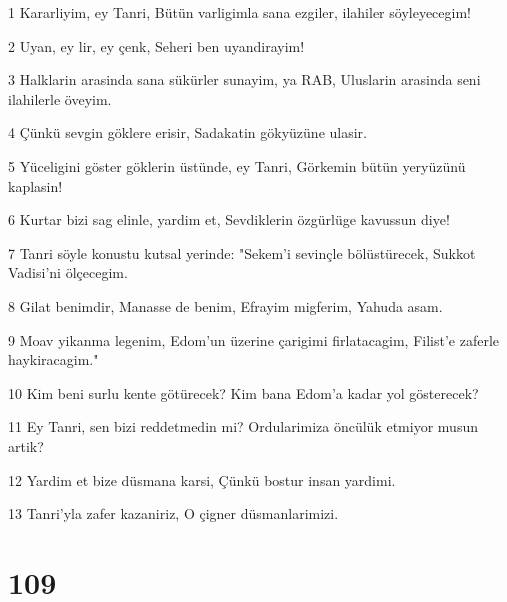\par 1 Kararliyim, ey Tanri, Bütün varligimla sana ezgiler, ilahiler söyleyecegim!
\par 2 Uyan, ey lir, ey çenk, Seheri ben uyandirayim!
\par 3 Halklarin arasinda sana sükürler sunayim, ya RAB, Uluslarin arasinda seni ilahilerle öveyim.
\par 4 Çünkü sevgin göklere erisir, Sadakatin gökyüzüne ulasir.
\par 5 Yüceligini göster göklerin üstünde, ey Tanri, Görkemin bütün yeryüzünü kaplasin!
\par 6 Kurtar bizi sag elinle, yardim et, Sevdiklerin özgürlüge kavussun diye!
\par 7 Tanri söyle konustu kutsal yerinde: "Sekem'i sevinçle bölüstürecek, Sukkot Vadisi'ni ölçecegim.
\par 8 Gilat benimdir, Manasse de benim, Efrayim migferim, Yahuda asam.
\par 9 Moav yikanma legenim, Edom'un üzerine çarigimi firlatacagim, Filist'e zaferle haykiracagim."
\par 10 Kim beni surlu kente götürecek? Kim bana Edom'a kadar yol gösterecek?
\par 11 Ey Tanri, sen bizi reddetmedin mi? Ordularimiza öncülük etmiyor musun artik?
\par 12 Yardim et bize düsmana karsi, Çünkü bostur insan yardimi.
\par 13 Tanri'yla zafer kazaniriz, O çigner düsmanlarimizi.

\chapter{109}

